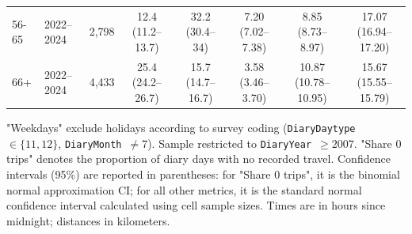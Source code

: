 \begin{table}[!htbp]
\begin{threeparttable}
\begin{tabular}{l l r c c c c c}
56-65 & 2022--2024 & 2,798 & 12.4 (11.2--13.7) & 32.2 (30.4--34) & 7.20 (7.02--7.38) & 8.85 (8.73--8.97) & 17.07 (16.94--17.20) \\
66+ & 2022--2024 & 4,433 & 25.4 (24.2--26.7) & 15.7 (14.7--16.7) & 3.58 (3.46--3.70) & 10.87 (10.78--10.95) & 15.67 (15.55--15.79) \\
\bottomrule
\end{tabular}
\begin{tablenotes}
\footnotesize
\item "Weekdays" exclude holidays according to survey coding (\texttt{DiaryDaytype}~$\in\{11,12\}$, \texttt{DiaryMonth}~$\neq 7$). Sample restricted to \texttt{DiaryYear}~$\ge 2007$. "Share 0 trips" denotes the proportion of diary days with no recorded travel. Confidence intervals (95\%) are reported in parentheses: for "Share 0 trips", it is the binomial normal approximation CI; for all other metrics, it is the standard normal confidence interval calculated using cell sample sizes. Times are in hours since midnight; distances in kilometers.
\end{tablenotes}
\end{threeparttable}
\end{table}
